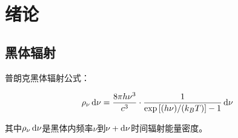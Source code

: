 \section{绪论}

\subsection{黑体辐射}

普朗克黑体辐射公式：

\begin{equation*}
  \begin{aligned}
    \rho_{\nu} \mathop{}\!\mathrm{d} \nu = \dfrac{8 \pi h \nu^3}{c^3} \cdot \dfrac{1}{\exp \left[ (h \nu) / (k_B T)  \right] - 1} \mathop{}\!\mathrm{d} \nu  
  \end{aligned}
\end{equation*}

其中$\rho_{\nu} \mathop{}\!\mathrm{d} \nu$是黑体内频率$\nu$到$\nu + \mathop{}\!\mathrm{d} \nu$时间辐射能量密度。



